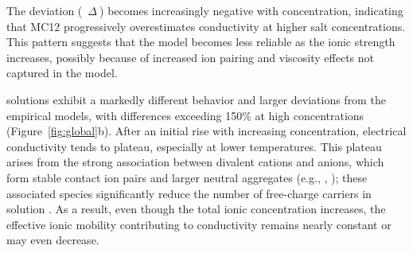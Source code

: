 \documentclass[journal=aesccq,manuscript=article]{achemso}
\begin{document}
The deviation (\ $ \Delta \ $) becomes increasingly negative with concentration, indicating that MC12 progressively overestimates conductivity at higher salt concentrations.
This pattern suggests that the model becomes less reliable as the ionic strength increases, possibly because of increased ion pairing and viscosity effects not captured in the model.



 solutions exhibit a markedly different behavior and larger deviations from the empirical models, with differences exceeding 150\% at high concentrations (Figure~\ref{fig:global}b). 
After an initial rise with increasing concentration, electrical conductivity tends to plateau, especially at lower temperatures. 
This plateau arises from the strong association between divalent  cations and  anions, which form stable contact ion pairs and larger neutral aggregates (e.g., , ); these associated species significantly reduce the number of free-charge carriers in solution \citep{marcus_ion_2006}. 
As a result, even though the total ionic concentration increases, the effective ionic mobility contributing to conductivity remains nearly constant or may even decrease. 
\end{document}
